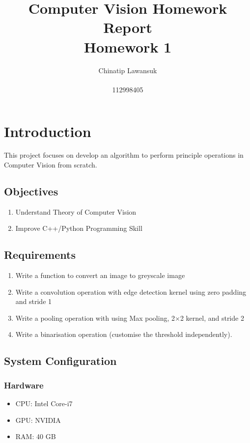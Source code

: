 \documentclass[12pt,a4paper]{report}
\title{Computer Vision Homework Report \\ \Large Homework 1}
\author{Chinatip Lawansuk\\\\112998405}
\date{}
\begin{document}
\maketitle

\tableofcontents

\chapter{Introduction}
This project focuses on develop an algorithm to perform principle operations in Computer Vision from scratch.

\section{Objectives}
\begin{enumerate}
  \item Understand Theory of Computer Vision
  \item Improve C++/Python Programming Skill
\end{enumerate}

\section{Requirements}
\begin{enumerate}
  \item Write a function to convert an image to greyscale image
  \item Write a convolution operation with edge detection kernel using zero padding and stride 1
  \item Write a pooling operation with using Max pooling, 2$\times$2 kernel, and  stride 2
  \item Write a binarisation operation (customise the threshold independently).
\end{enumerate}

\section{System Configuration}
\subsection{Hardware}
\begin{itemize}
  \item CPU\@: Intel Core-i7
  \item GPU\@: NVIDIA
  \item RAM\@: 40 GB
\end{itemize}
\end{document}
